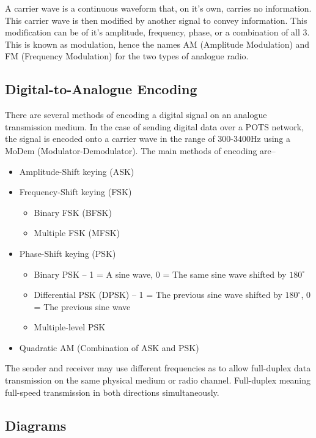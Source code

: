 A carrier wave is a continuous waveform that, on it's own, carries no information. This carrier wave is then modified
 by another signal to convey information. This modification can be of it's amplitude, frequency, phase, or a combination
 of all 3. This is known as modulation, hence the names AM (Amplitude Modulation) and FM (Frequency Modulation) for the
 two types of analogue radio.

\subsection*{Digital-to-Analogue Encoding}

There are several methods of encoding a digital signal on an analogue transmission medium. In the case of sending
 digital data over a POTS network, the signal is encoded onto a carrier wave in the range of $300$-$3400$Hz using a
 MoDem (Modulator-Demodulator). The main methods of encoding are--

\begin{itemize}
  \item Amplitude-Shift keying (ASK)
  \item Frequency-Shift keying (FSK)
  \begin{itemize}
    \item Binary FSK (BFSK)
    \item Multiple FSK (MFSK)
  \end{itemize}
  \item Phase-Shift keying (PSK)
  \begin{itemize}
    \item Binary PSK -- 1 = A sine wave, 0 = The same sine wave shifted by $180^{\circ}$
    \item Differential PSK (DPSK) -- 1 = The previous sine wave shifted by $180^{\circ}$, 0 = The previous sine wave
    \item Multiple-level PSK
  \end{itemize}
  \item Quadratic AM (Combination of ASK and PSK)
\end{itemize}

The sender and receiver may use different frequencies as to allow full-duplex data transmission on the same physical
 medium or radio channel. Full-duplex meaning full-speed transmission in both directions simultaneously.

\subsection*{Diagrams}      

